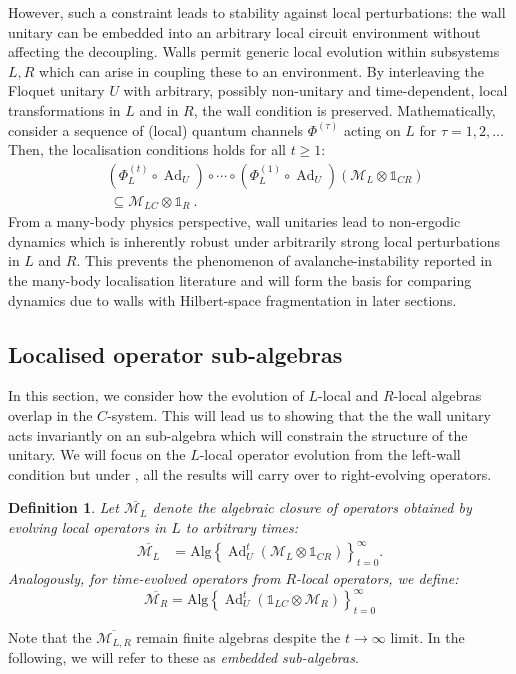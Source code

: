 \documentclass[11pt, twocolumn, floatfix, superscriptaddress, aps, prb, raggedbottom]{revtex4-2}
\newtheorem{definition}{Definition}[section]
\newcommand{\Id}{\mathds{1}}
\DeclareMathOperator{\Ad}{Ad}
\begin{document}
However, such a constraint leads to stability against local perturbations: the wall unitary can be embedded into an arbitrary local circuit environment without affecting the decoupling. Walls permit generic local evolution within subsystems $L, R$ which can arise in coupling these to an environment. By interleaving the Floquet unitary $U$ with arbitrary, possibly non-unitary and time-dependent, local transformations in $L$ and in $R$, the wall condition is preserved. Mathematically, consider a sequence of (local) quantum channels $\Phi^{(\tau)}$ acting on $L$ for $\tau = 1, 2,\ldots$ Then, the localisation conditions holds for all $t \ge 1$:
\begin{align}
  \nonumber
  & \left(\Phi^{(t)}_L \circ \Ad_U \right) 
  \circ \cdots \circ
  \left(\Phi^{(1)}_L \circ \Ad_U \right) 
  (\mathcal{M}_L \otimes \Id_{CR}) 
  \\ &\ \subseteq \mathcal{M}_{LC} \otimes \Id_R\ .
\end{align}
From a many-body physics perspective, wall unitaries lead to non-ergodic dynamics which is inherently robust under arbitrarily strong local perturbations in $L$ and $R$. This prevents the phenomenon of avalanche-instability reported in the many-body localisation literature \cite{Morningstar2022, Abanin2019, Ha2023} and will form the basis for comparing dynamics due to walls with Hilbert-space fragmentation \cite{Moudgalya2022, Kovacs2026, Logaric2025} in later sections.

\subsection{Localised operator sub-algebras \label{sec:sub_algebra_embedding}}
In this section, we consider how the evolution of $L$-local and $R$-local algebras overlap in the $C$-system. This will lead us to showing that the the wall unitary acts invariantly on an sub-algebra which will constrain the structure of the unitary.  We will focus on the $L$-local operator evolution from the left-wall condition but under , all the results will carry over to right-evolving operators.

 \begin{definition}
     Let $\overline{\mathcal{M}_L}$ denote the algebraic closure of operators obtained by evolving local operators in $L$ to arbitrary times:
     \begin{align}
            \overline{\mathcal{M}_L} &= 
            \mathrm{Alg}{\left \{  \Ad_U^t(\mathcal{M}_L\otimes \Id_{CR})  \right \}_{t=0}^{\infty}}.
     \end{align}
     Analogously, for time-evolved operators from $R$-local operators, we define: 
     \begin{equation}
        \overline{\mathcal{M}_R} = 
            \mathrm{Alg}{\left \{\Ad_U^t(\Id_{LC} \otimes \mathcal{M}_R)   \right \}_{t=0}^{\infty}}
    \end{equation}
 \end{definition}
\noindent Note that the $\overline{\mathcal{M}_{L, R}}$ remain finite algebras despite the $t \rightarrow\infty$ limit. In the following, we will refer to these as \textit{embedded sub-algebras}.
\end{document}
